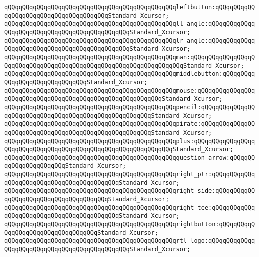 \verb|qQQqqQQqqQQqqQQqqQQqqQQqqQQqqQQqqQQqqQQqqQQqqQQqleftbutton:qQQqqQQqqQQqqQQqqQQqqQQqqQQqqQQqqQQqqQQqStandard_Xcursor;|\newline
\verb|qQQqqQQqqQQqqQQqqQQqqQQqqQQqqQQqqQQqqQQqqQQqqQQqll_angle:qQQqqQQqqQQqqQQqqQQqqQQqqQQqqQQqqQQqqQQqqQQqqQQqStandard_Xcursor;|\newline
\verb|qQQqqQQqqQQqqQQqqQQqqQQqqQQqqQQqqQQqqQQqqQQqqQQqlr_angle:qQQqqQQqqQQqqQQqqQQqqQQqqQQqqQQqqQQqqQQqqQQqqQQqStandard_Xcursor;|\newline
\verb|qQQqqQQqqQQqqQQqqQQqqQQqqQQqqQQqqQQqqQQqqQQqqQQqman:qQQqqQQqqQQqqQQqqQQqqQQqqQQqqQQqqQQqqQQqqQQqqQQqqQQqqQQqqQQqqQQqqQQqStandard_Xcursor;|\newline
\verb|qQQqqQQqqQQqqQQqqQQqqQQqqQQqqQQqqQQqqQQqqQQqqQQqmiddlebutton:qQQqqQQqqQQqqQQqqQQqqQQqqQQqqQQqStandard_Xcursor;|\newline
\verb|qQQqqQQqqQQqqQQqqQQqqQQqqQQqqQQqqQQqqQQqqQQqqQQqmouse:qQQqqQQqqQQqqQQqqQQqqQQqqQQqqQQqqQQqqQQqqQQqqQQqqQQqqQQqqQQqStandard_Xcursor;|\newline
\verb|qQQqqQQqqQQqqQQqqQQqqQQqqQQqqQQqqQQqqQQqqQQqqQQqpencil:qQQqqQQqqQQqqQQqqQQqqQQqqQQqqQQqqQQqqQQqqQQqqQQqqQQqqQQqStandard_Xcursor;|\newline
\verb|qQQqqQQqqQQqqQQqqQQqqQQqqQQqqQQqqQQqqQQqqQQqqQQqpirate:qQQqqQQqqQQqqQQqqQQqqQQqqQQqqQQqqQQqqQQqqQQqqQQqqQQqqQQqStandard_Xcursor;|\newline
\verb|qQQqqQQqqQQqqQQqqQQqqQQqqQQqqQQqqQQqqQQqqQQqqQQqplus:qQQqqQQqqQQqqQQqqQQqqQQqqQQqqQQqqQQqqQQqqQQqqQQqqQQqqQQqqQQqqQQqStandard_Xcursor;|\newline
\verb|qQQqqQQqqQQqqQQqqQQqqQQqqQQqqQQqqQQqqQQqqQQqqQQqquestion_arrow:qQQqqQQqqQQqqQQqqQQqqQQqStandard_Xcursor;|\newline
\verb|qQQqqQQqqQQqqQQqqQQqqQQqqQQqqQQqqQQqqQQqqQQqqQQqright_ptr:qQQqqQQqqQQqqQQqqQQqqQQqqQQqqQQqqQQqqQQqqQQqStandard_Xcursor;|\newline
\verb|qQQqqQQqqQQqqQQqqQQqqQQqqQQqqQQqqQQqqQQqqQQqqQQqright_side:qQQqqQQqqQQqqQQqqQQqqQQqqQQqqQQqqQQqqQQqStandard_Xcursor;|\newline
\verb|qQQqqQQqqQQqqQQqqQQqqQQqqQQqqQQqqQQqqQQqqQQqqQQqright_tee:qQQqqQQqqQQqqQQqqQQqqQQqqQQqqQQqqQQqqQQqqQQqStandard_Xcursor;|\newline
\verb|qQQqqQQqqQQqqQQqqQQqqQQqqQQqqQQqqQQqqQQqqQQqqQQqrightbutton:qQQqqQQqqQQqqQQqqQQqqQQqqQQqqQQqqQQqStandard_Xcursor;|\newline
\verb|qQQqqQQqqQQqqQQqqQQqqQQqqQQqqQQqqQQqqQQqqQQqqQQqrtl_logo:qQQqqQQqqQQqqQQqqQQqqQQqqQQqqQQqqQQqqQQqqQQqqQQqStandard_Xcursor;|\newline

